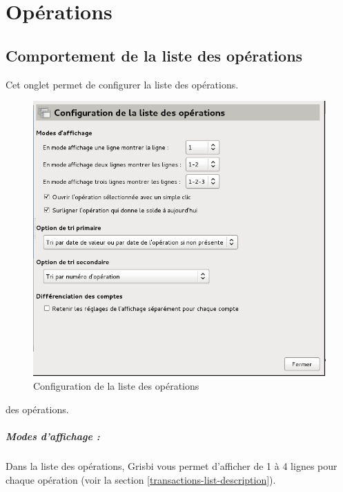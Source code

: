 \section{Opérations\label{setup-operations}}


\subsection{Comportement de la liste des opérations\label{setup-operations-list}}

Cet onglet permet de configurer la liste \ifIllustration des opérations.
\begin{figure}[ht]
\begin{center}
\includegraphics[scale=0.5]{image/screenshot/setup_listBehaviour}
\end{center}
\caption{Configuration de la liste des opérations}
\label{setup-listBehaviour-img}
\end{figure}
\else des opérations.
\fi


\subparagraph{Modes d'affichage :\label{setup-operations-list-modes}}

Dans la liste des opérations, Grisbi vous permet d'afficher de 1 à 4 lignes pour chaque opération (voir la section \vref{transactions-list-description}). 

